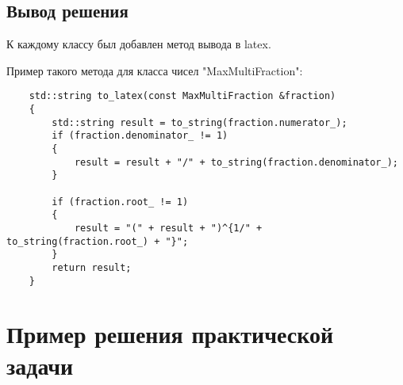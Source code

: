 \documentclass[specialist, substylefile = spbureport.rtx,
    subf,href,colorlinks=true, 12pt]{disser}
\begin{document}
    \section{Вывод решения}
    К каждому классу был добавлен метод вывода в latex.
    
    Пример такого метода для класса чисел "MaxMultiFraction":

    \begin{lstlisting}
    std::string to_latex(const MaxMultiFraction &fraction)
    {
        std::string result = to_string(fraction.numerator_);
        if (fraction.denominator_ != 1)
        {
            result = result + "/" + to_string(fraction.denominator_);
        }

        if (fraction.root_ != 1)
        {
            result = "(" + result + ")^{1/" + to_string(fraction.root_) + "}";
        }
        return result;
    }
    \end{lstlisting}
    




    \chapter{Пример решения практической задачи}
        

    
\end{document}
